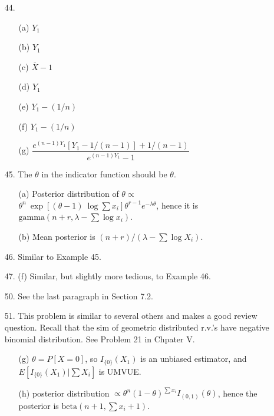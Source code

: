\begin{enumerate}
	\item[44.] \begin{enumerate}
		\item[(a)] $Y_1$
		\item[(b)] $Y_1$
		\item[(c)] $\overline{X}-1$
		\item[(d)] $Y_1$
		\item[(e)] $Y_1 - (1/n)$
		\item[(f)] $Y_1 - (1/n)$
		\item[(g)] $\dfrac{e^{(n-1)Y_1}[Y_1-1/(n-1)] + 1/(n-1)}{e^{(n-1)Y_1} - 1}$
	\end{enumerate}

	\newpage
	\item[45.] The $\theta$ in the indicator function should be $\theta$.
	\begin{enumerate}
		\item[(a)] Posterior distribution of $\theta \propto$ \\
		$ \theta^n\ \exp[(\theta-1)\ \log\sum x_i]\theta^{r-1}e^{-\lambda\theta}$, hence it is $\mbox{gamma}(n+r, \lambda-\sum \log x_i)$.
		\item[(b)] Mean posterior is $(n+r)/(\lambda - \sum\log X_i)$. 
	\end{enumerate}
  
  	\item[46.] Similar to Example 45.
  	
  	\item[47.] (f) Similar, but slightly more tedious, to Example 46. 
  	
  	\item[50.] See the last paragraph in Section 7.2.	
  	
    \item[51.] This problem is similar to several others and makes a good review question.  Recall that the sim of geometric distributed r.v.'s have negative binomial distribution. See Problem 21 in Chpater V.
    \begin{enumerate}
    	\item[(g)] $\theta=P[X=0]$, so $I_{\{0\}}(X_1)$ is an unbiased estimator, and $E[I_{\{0\}}(X_1)\vert \sum X_i]$ is UMVUE.
    	\item[(h)] posterior distribution $\propto \theta^n(1-\theta)^{\sum x_i}I_{(0,1)}(\theta)$, hence the posterior is $\mbox{beta}(n+1, \sum x_i +1)$.
    \end{enumerate}	
  	

\end{enumerate}
